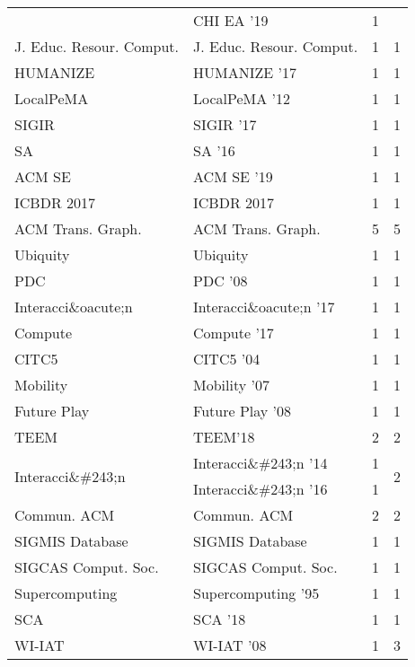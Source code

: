 \begin{table*}[t]
\begin{tabular}{llrr}
& CHI EA '19 & 1 &\\
\multirow{1}{*}{J. Educ. Resour. Comput.} & J. Educ. Resour. Comput. & 1 & \multirow{1}{*}{1}\\
\multirow{1}{*}{HUMANIZE } & HUMANIZE '17 & 1 & \multirow{1}{*}{1}\\
\multirow{1}{*}{LocalPeMA } & LocalPeMA '12 & 1 & \multirow{1}{*}{1}\\
\multirow{1}{*}{SIGIR } & SIGIR '17 & 1 & \multirow{1}{*}{1}\\
\multirow{1}{*}{SA } & SA '16 & 1 & \multirow{1}{*}{1}\\
\multirow{1}{*}{ACM SE } & ACM SE '19 & 1 & \multirow{1}{*}{1}\\
\multirow{1}{*}{ICBDR 2017} & ICBDR 2017 & 1 & \multirow{1}{*}{1}\\
\multirow{1}{*}{ACM Trans. Graph.} & ACM Trans. Graph. & 5 & \multirow{1}{*}{5}\\
\multirow{1}{*}{Ubiquity} & Ubiquity & 1 & \multirow{1}{*}{1}\\
\multirow{1}{*}{PDC } & PDC '08 & 1 & \multirow{1}{*}{1}\\
\multirow{1}{*}{Interacci\&oacute;n } & Interacci\&oacute;n '17 & 1 & \multirow{1}{*}{1}\\
\multirow{1}{*}{Compute } & Compute '17 & 1 & \multirow{1}{*}{1}\\
\multirow{1}{*}{CITC5 } & CITC5 '04 & 1 & \multirow{1}{*}{1}\\
\multirow{1}{*}{Mobility } & Mobility '07 & 1 & \multirow{1}{*}{1}\\
\multirow{1}{*}{Future Play } & Future Play '08 & 1 & \multirow{1}{*}{1}\\
\multirow{1}{*}{TEEM} & TEEM'18 & 2 & \multirow{1}{*}{2}\\
\multirow{2}{*}{Interacci\&\#243;n } & Interacci\&\#243;n '14 & 1 & \multirow{2}{*}{2}\\
& Interacci\&\#243;n '16 & 1 &\\
\multirow{1}{*}{Commun. ACM} & Commun. ACM & 2 & \multirow{1}{*}{2}\\
\multirow{1}{*}{SIGMIS Database} & SIGMIS Database & 1 & \multirow{1}{*}{1}\\
\multirow{1}{*}{SIGCAS Comput. Soc.} & SIGCAS Comput. Soc. & 1 & \multirow{1}{*}{1}\\
\multirow{1}{*}{Supercomputing } & Supercomputing '95 & 1 & \multirow{1}{*}{1}\\
\multirow{1}{*}{SCA } & SCA '18 & 1 & \multirow{1}{*}{1}\\
\multirow{2}{*}{WI-IAT } & WI-IAT '08 & 1 & \multirow{2}{*}{3}\\

\end{tabular}
\end{table*}
